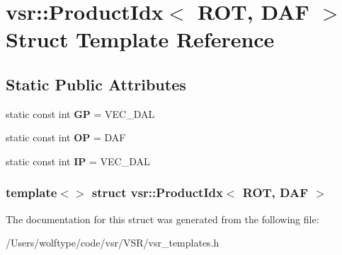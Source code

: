 \hypertarget{structvsr_1_1_product_idx_3_01_r_o_t_00_01_d_a_f_01_4}{\section{vsr\-:\-:Product\-Idx$<$ R\-O\-T, D\-A\-F $>$ Struct Template Reference}
\label{structvsr_1_1_product_idx_3_01_r_o_t_00_01_d_a_f_01_4}
}
\subsection*{Static Public Attributes}
\begin{DoxyCompactItemize}
\item 
\hypertarget{structvsr_1_1_product_idx_3_01_r_o_t_00_01_d_a_f_01_4_ad33cc9f7144d8224e0e78bbf3e74f699}{static const int {\bfseries G\-P} = V\-E\-C\-\_\-\-D\-A\-L}\label{structvsr_1_1_product_idx_3_01_r_o_t_00_01_d_a_f_01_4_ad33cc9f7144d8224e0e78bbf3e74f699}

\item 
\hypertarget{structvsr_1_1_product_idx_3_01_r_o_t_00_01_d_a_f_01_4_ae79b87a26d6fc0623adecfd6c75f6efe}{static const int {\bfseries O\-P} = D\-A\-F}\label{structvsr_1_1_product_idx_3_01_r_o_t_00_01_d_a_f_01_4_ae79b87a26d6fc0623adecfd6c75f6efe}

\item 
\hypertarget{structvsr_1_1_product_idx_3_01_r_o_t_00_01_d_a_f_01_4_ab8be5c9a7388069f47965260c83d81f4}{static const int {\bfseries I\-P} = V\-E\-C\-\_\-\-D\-A\-L}\label{structvsr_1_1_product_idx_3_01_r_o_t_00_01_d_a_f_01_4_ab8be5c9a7388069f47965260c83d81f4}

\end{DoxyCompactItemize}
\subsubsection*{template$<$$>$ struct vsr\-::\-Product\-Idx$<$ R\-O\-T, D\-A\-F $>$}



The documentation for this struct was generated from the following file\-:\begin{DoxyCompactItemize}
\item 
/\-Users/wolftype/code/vsr/\-V\-S\-R/vsr\-\_\-templates.\-h\end{DoxyCompactItemize}
